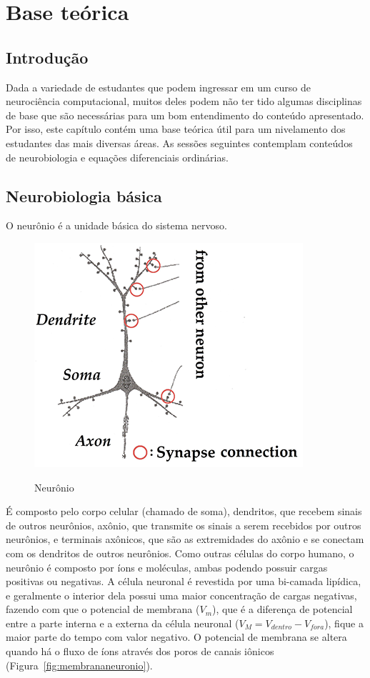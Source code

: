 \chapter{Base teórica}\label{cap:teoria}
\section{Introdução}\label{sec:teoria_intro}
Dada a variedade de estudantes que podem ingressar em um curso de neurociência computacional, muitos deles podem não ter tido algumas disciplinas de base que são necessárias para um bom entendimento do conteúdo apresentado. Por isso, este capítulo contém uma base teórica útil para um nivelamento dos estudantes das mais diversas áreas. As sessões seguintes contemplam conteúdos de neurobiologia e equações diferenciais ordinárias. %

\section{Neurobiologia básica}\label{sec:fisiologia}
O neurônio é a unidade básica do sistema nervoso.
\begin{figure}[tb]
	\centering
	\caption[Neurônio]{Neurônio}
	\includegraphics[width=0.55\linewidth]{figs/neuronio}
	\label{fig:neuronio}
\end{figure}
É composto pelo corpo celular (chamado de soma), dendritos, que recebem sinais de outros neurônios, axônio, que transmite os sinais a serem recebidos por outros neurônios, e terminais axônicos, que são as extremidades do axônio e se conectam com os dendritos de outros neurônios. Como outras células do corpo humano, o neurônio é composto por íons e moléculas, ambas podendo possuir cargas positivas ou negativas. A célula neuronal é revestida por uma bi-camada lipídica, e geralmente o interior dela possui uma maior concentração de cargas negativas, fazendo com que o potencial de membrana ($V_m$), que é a diferença de potencial entre a parte interna e a externa da célula neuronal ($V_M=V_{dentro}-V_{fora}$), fique a maior parte do tempo com valor negativo. O potencial de membrana se altera quando há o fluxo de íons através dos poros de canais iônicos (Figura~\ref{fig:membrananeuronio}).

